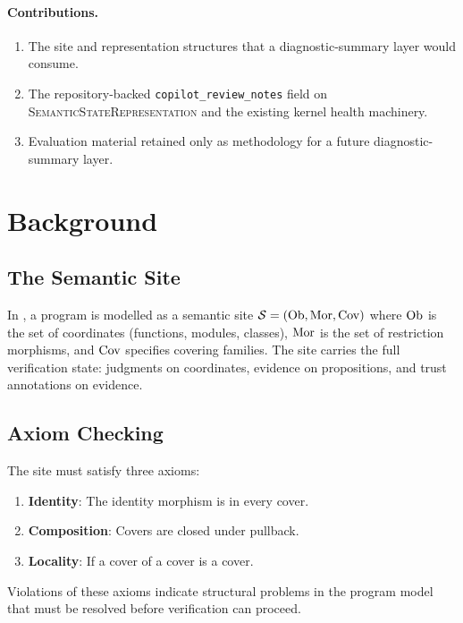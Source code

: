 \documentclass[11pt]{article}
\newcommand{\CopRevNotes}{\texttt{copilot\_review\_notes}}
\newcommand{\SemState}{\textsc{SemanticStateRepresentation}}
\begin{document}
\paragraph{Contributions.}
\begin{enumerate}[leftmargin=2em]
  \item The site and representation structures that a diagnostic-summary
        layer would consume.
  \item The repository-backed \CopRevNotes{} field on \SemState{} and the
        existing kernel health machinery.
  \item Evaluation material retained only as methodology for a future
        diagnostic-summary layer.
\end{enumerate}

\section{Background}\label{sec:bg}

\subsection{The Semantic Site}

In \JuGeo{}, a program is modelled as a semantic site $\mathcal{S} = (\mathrm{Ob}, \mathrm{Mor},
\mathrm{Cov})$ where $\mathrm{Ob}$ is the set of coordinates (functions, modules, classes),
$\mathrm{Mor}$ is the set of restriction morphisms, and $\mathrm{Cov}$ specifies covering
families.  The site carries the full verification state: judgments on
coordinates, evidence on propositions, and trust annotations on evidence.

\subsection{Axiom Checking}

The site must satisfy three axioms:
\begin{enumerate}[leftmargin=2em]
  \item \textbf{Identity}: The identity morphism is in every cover.
  \item \textbf{Composition}: Covers are closed under pullback.
  \item \textbf{Locality}: If a cover of a cover is a cover.
\end{enumerate}

Violations of these axioms indicate structural problems in the program model
that must be resolved before verification can proceed.
\end{document}
